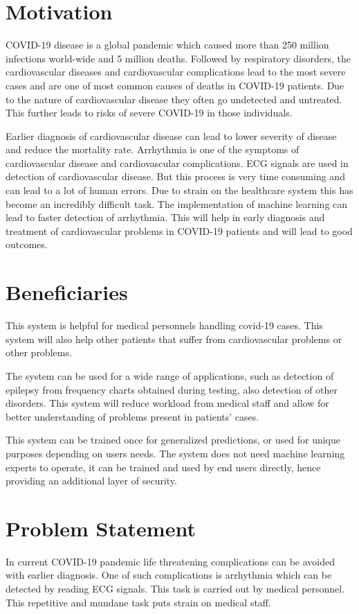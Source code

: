 \section{Motivation} \label{sec:motivation}

COVID-19 disease is a global pandemic which caused more than 250 million infections world-wide and 5 million deaths. Followed by respiratory disorders, the cardiovascular diseases and cardiovascular complications lead to the most severe cases and are one of most common causes of deaths in COVID-19 patients. Due to the nature of cardiovascular disease they often go undetected and untreated. This further leads to risks of severe COVID-19 in those individuals.

Earlier diagnosis of cardiovascular disease can lead to lower severity of disease and reduce the mortality rate. Arrhythmia is one of the symptoms of cardiovascular disease and cardiovascular complications. ECG signals are used in detection of cardiovascular disease. But this process is very time consuming and can lead to a lot of human errors. Due to strain on the healthcare system this has become an incredibly difficult task. The implementation of machine learning can lead to faster detection of arrhythmia. This will help in early diagnosis and treatment of cardiovascular problems in COVID-19 patients and will lead to good outcomes.

\section{Beneficiaries} \label{sec:beneficiaries}

This system is helpful for medical personnels handling covid-19 cases. This system will also help other patients that suffer from cardiovascular problems or other problems.

The system can be used for a wide range of applications, such as detection of epilepsy from frequency charts obtained during testing, also detection of other disorders. This system will reduce workload from medical staff and allow for better understanding of problems present in patients' cases.

This system can be trained once for generalized predictions, or used for unique purposes depending on users needs. The system does not need machine learning experts to operate, it can be trained and used by end users directly, hence providing an additional layer of security.

\section{Problem Statement} \label{sec:problem_statement}
In current COVID-19 pandemic life threatening complications can be avoided with earlier diagnosis. One of such complications is arrhythmia which can be detected by reading ECG signals. This task is carried out by medical personnel. This repetitive and mundane task puts strain on medical staff.

